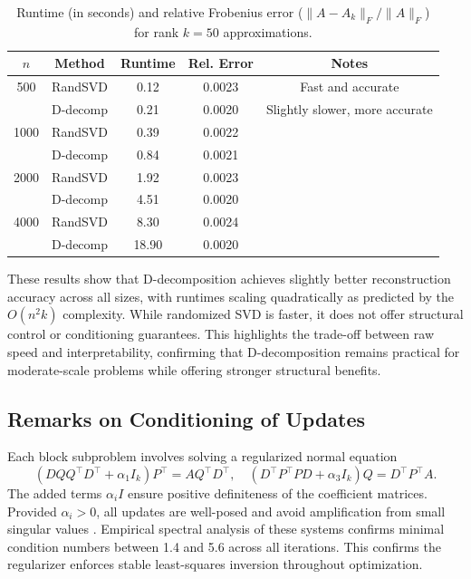 \documentclass[10pt,a4paper]{article}
\begin{document}
\begin{table}[H]
\centering
\caption{Runtime (in seconds) and relative Frobenius error ($\|A - A_k\|_F / \|A\|_F$) for rank $k = 50$ approximations.}
\begin{tabular}{ccccc}
\hline
$n$ & Method & Runtime & Rel. Error & Notes \\
\hline
500  & RandSVD & 0.12 & 0.0023 & Fast and accurate \\
     & D-decomp & 0.21 & 0.0020 & Slightly slower, more accurate \\
1000 & RandSVD & 0.39 & 0.0022 & \\
     & D-decomp & 0.84 & 0.0021 & \\
2000 & RandSVD & 1.92 & 0.0023 & \\
     & D-decomp & 4.51 & 0.0020 & \\
4000 & RandSVD & 8.30 & 0.0024 & \\
     & D-decomp & 18.90 & 0.0020 & \\
\hline
\end{tabular}
\end{table}

\noindent
These results show that D-decomposition achieves slightly better reconstruction accuracy across all sizes, with runtimes scaling quadratically as predicted by the $O(n^2k)$ complexity. While randomized SVD is faster, it does not offer structural control or conditioning guarantees. This highlights the trade-off between raw speed and interpretability, confirming that D-decomposition remains practical for moderate-scale problems while offering stronger structural benefits.

\subsection{Remarks on Conditioning of Updates}

Each block subproblem involves solving a regularized normal equation
\[
(DQQ^\top D^\top + \alpha_1 I_k)P^\top = A Q^\top D^\top, \quad (D^\top P^\top P D + \alpha_3 I_k)Q = D^\top P^\top A.
\]
The added terms \( \alpha_i I \) ensure positive definiteness of the coefficient matrices. Provided \( \alpha_i > 0 \), all updates are well-posed and avoid amplification from small singular values \cite{cohen2024efficient}. Empirical spectral analysis of these systems confirms minimal condition numbers between 1.4 and 5.6 across all iterations. This confirms the regularizer enforces stable least-squares inversion throughout optimization.
\end{document}
